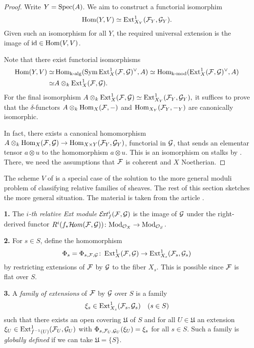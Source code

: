 \begin{proof}
Write $Y=\operatorname{Spec}(A)$. We aim to construct a functorial isomorphim
\[
\operatorname{Hom}(Y,V)\simeq \operatorname{Ext}^1_{X_Y}(\mathcal{F}_Y, \mathcal{G}_Y).
\]
Given such an isomorphism for all $Y$, the required universal extension is the image of $\operatorname{id}\in\operatorname{Hom}(V,V)$.

Note that there exist functorial isomorphisms
\begin{align*}
\operatorname{Hom}(Y,V)
\simeq & \operatorname{Hom}_{\text{k-alg}}(\operatorname{Sym}\operatorname{Ext}^1_X(\mathcal{F},\mathcal{G})^\vee,A) 
\simeq \operatorname{Hom}_{\text{k-mod}}(\operatorname{Ext}^1_X(\mathcal{F},\mathcal{G})^\vee,A) \\
\simeq & A \otimes_k \operatorname{Ext}^1_{X}(\mathcal{F},\mathcal{G}).
\end{align*}
For the final isomorphism
$A \otimes_k \operatorname{Ext}^1_{X}(\mathcal{F},\mathcal{G})\simeq
\operatorname{Ext}^1_{X_Y}(\mathcal{F}_Y,\mathcal{G}_Y),$
it suffices to prove that the $\delta$-functors\footnotemark{} $A\otimes_k \operatorname{Hom}_X(\mathcal{F},-)$ and
$\operatorname{Hom}_{X_Y}(\mathcal{F}_Y, {-}_Y)$ are canonically isomorphic.


In fact, there exists a canonical homomorphism $A\otimes_k \operatorname{Hom}_X(\mathcal{F},\mathcal{G}) \to\operatorname{Hom}_{X\times Y}(\mathcal{F}_Y, {\mathcal{G}}_Y)$, functorial in $\mathcal{G}$, that sends an elementar tensor $a \otimes u$ to the homomorphism $a\otimes u$. This is an isomorphism on stalks by
\cite[Ch.\ \textsc{I}, \S 2.10]{bourbaki-commutative-algebra}.
There, we need the assumptions that $\mathcal{F}$ is coherent and $X$ Noetherian. 
\end{proof}

The scheme $V$ of  is a special case of the solution to the more general moduli problem of classifying relative families of sheaves. The rest of this section sketches the more general situation. The material is taken from the article \cite{lange-universal-extensions}.

\begin{definition}
	\textbf{1.} The \emph{$i$-th relative Ext module} $\mathcal{E}\!\mathit{xt}^i_f(\mathcal{F},\mathcal{G})$ is the image of $\mathcal{G}$ under the right-derived functor
	$R^i(f_{*}\mathcal{H}\!\mathit{om}(\mathcal{F},\mathcal{G}))
	\colon \mathrm{Mod}_{\mathcal{O}_X} \to \mathrm{Mod}_{\mathcal{O}_S}$.

	\textbf{2.} For $s\in S$, define the homomorphism
	\[
		\Phi_s = \Phi_{s,\mathcal{F},\mathcal{G}}
		\colon \operatorname{Ext}^1_X(\mathcal{F},\mathcal{G})
		\to \operatorname{Ext}^1_{X_s}(\mathcal{F}_s, \mathcal{G}_s)
	\]
	by restricting extensions of $\mathcal{F}$ by $\mathcal{G}$ to the fiber $X_s$. This is possible since $\mathcal{F}$ is flat over $S$.

	\textbf{3.} A \emph{family of extensions} of $\mathcal{F}$ by $\mathcal{G}$ over $S$ is a family
	\[
		\xi_s \in \operatorname{Ext}^1_{X_s}(\mathcal{F}_s,\mathcal{G}_s) \quad (s\in S)
	\]
	such that there exists an open covering $\mathfrak{U}$ of $S$ and for all $U\in \mathfrak{U}$ an extension $\xi_U \in \operatorname{Ext}^1_{f^{-1}(U)}(\mathcal{F}_U,\mathcal{G}_U)$
	with $\Phi_{s,\mathcal{F}_U,\mathcal{G}_U}(\xi_U) = \xi_s$ for all $s\in S$.
	Such a family is \emph{globally defined} if we can take $\mathfrak{U} = \{S\}$.
\end{definition}

